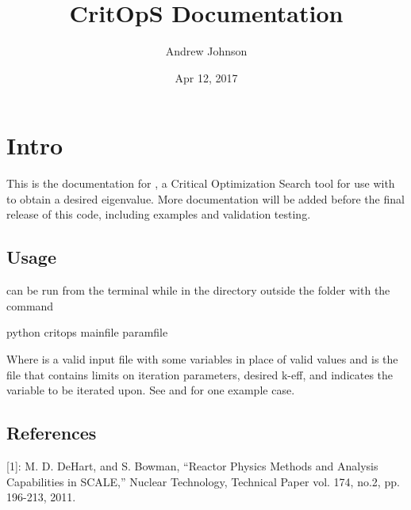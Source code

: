 \documentclass[letterpaper,10pt,english]{sphinxmanual}
\title{CritOpS Documentation}
\date{Apr 12, 2017}
\author{Andrew Johnson}
\begin{document}
\maketitle
\sphinxtableofcontents
{}\label{\detokenize{index::doc}}



\chapter{Intro}
\label{\detokenize{intro:intro}}\label{\detokenize{intro:welcome-to-critops-s-documentation}}\label{\detokenize{intro::doc}}
This is the documentation for , a Critical Optimization Search tool for use with  to obtain a desired eigenvalue.
More documentation will be added before the final release of this code, including examples and validation testing.


\section{Usage}
\label{\detokenize{intro:usage}}
 can be run from the terminal while in the directory outside the  folder with the command

\begin{sphinxVerbatim}[commandchars=\\\{\}]
\PYGZdl{} python critops \PYGZlt{}mainfile\PYGZgt{} \PYGZlt{}paramfile\PYGZgt{}
\end{sphinxVerbatim}

Where  is a valid  input file with some variables in place of valid values and  is the
file that contains limits on iteration parameters, desired k-eff, and indicates the variable to be iterated upon.
See  and  for one example case.


\section{References}
\label{\detokenize{intro:references}}
{[}1{]}: M. D. DeHart, and S. Bowman, ``Reactor Physics Methods and Analysis Capabilities in SCALE,'' Nuclear Technology, Technical Paper vol. 174, no.2, pp. 196-213, 2011.
\end{document}
